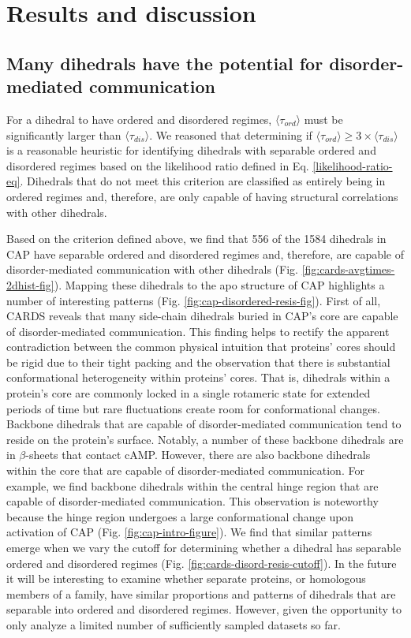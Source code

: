 \documentclass[../main.tex]{subfiles}
\begin{document}
    \section{Results and discussion}
    \subsection{Many dihedrals have the potential for disorder-mediated communication}
        For a dihedral to have ordered and disordered regimes, 〈$\tau_{ord}$〉 must be significantly larger than 〈$\tau_{dis}$〉. We reasoned that determining if ${\langle\tau_{ord}\rangle} \geq { 3\times\langle\tau_{dis}}\rangle$  is a reasonable heuristic for identifying dihedrals with separable ordered and disordered regimes based on the likelihood ratio defined in Eq. \ref{likelihood-ratio-eq}. Dihedrals that do not meet this criterion are classified as entirely being in ordered regimes and, therefore, are only capable of having structural correlations with other dihedrals. 

        Based on the criterion defined above, we find that 556 of the 1584 dihedrals in CAP have separable ordered and disordered regimes and, therefore, are capable of disorder-mediated communication with other dihedrals (Fig. \ref{fig:cards-avgtimes-2dhist-fig}). Mapping these dihedrals to the apo structure of CAP highlights a number of interesting patterns (Fig. \ref{fig:cap-disordered-resis-fig}). First of all, CARDS reveals that many side-chain dihedrals buried in CAP’s core are capable of disorder-mediated communication. This finding helps to rectify the apparent contradiction between the common physical intuition that proteins’ cores should be rigid due to their tight packing and the observation that there is substantial conformational heterogeneity within proteins’ cores\cite{Fraser:2011jf,bowman2014extensive}. That is, dihedrals within a protein’s core are commonly locked in a single rotameric state for extended periods of time but rare fluctuations create room for conformational changes. Backbone dihedrals that are capable of disorder-mediated communication tend to reside on the protein’s surface. Notably, a number of these backbone dihedrals are in $\beta$-sheets that contact cAMP. However, there are also backbone dihedrals within the core that are capable of disorder-mediated communication. For example, we find backbone dihedrals within the central hinge region that are capable of disorder-mediated communication. This observation is noteworthy because the hinge region undergoes a large conformational change upon activation of CAP (Fig. \ref{fig:cap-intro-figure})\cite{Popovych:2009iu,Tzeng:2009im,Tzeng:2012cu}. We find that similar patterns emerge when we vary the cutoff for determining whether a dihedral has separable ordered and disordered regimes (Fig. \ref{fig:cards-disord-resis-cutoff}). In the future it will be interesting to examine whether separate proteins, or homologous members of a family, have similar proportions and patterns of dihedrals that are separable into ordered and disordered regimes. However, given the opportunity to only analyze a limited number of sufficiently sampled datasets so far\cite{Cruz2020vp35m,Sun:2018kx,porter_conformational_2020}.
\end{document}
